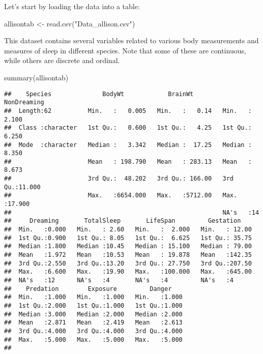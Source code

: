 \documentclass[
]{book}
\newenvironment{Shaded}{\begin{snugshade}}{\end{snugshade}}
\newcommand{\FunctionTok}[1]{\textcolor[rgb]{0.00,0.00,0.00}{#1}}
\newcommand{\NormalTok}[1]{#1}
\newcommand{\OtherTok}[1]{\textcolor[rgb]{0.56,0.35,0.01}{#1}}
\newcommand{\StringTok}[1]{\textcolor[rgb]{0.31,0.60,0.02}{#1}}
\begin{document}
Let's start by loading the data into a table:

\begin{Shaded}
\begin{Highlighting}[]
\NormalTok{allisontab }\OtherTok{\textless{}{-}} \FunctionTok{read.csv}\NormalTok{(}\StringTok{"Data\_allison.csv"}\NormalTok{)}
\end{Highlighting}
\end{Shaded}

This dataset contains several variables related to various body measurements and measures of sleep in different species. Note that some of these are continuous, while others are discrete and ordinal.

\begin{Shaded}
\begin{Highlighting}[]
\FunctionTok{summary}\NormalTok{(allisontab)}
\end{Highlighting}
\end{Shaded}

\begin{verbatim}
##    Species              BodyWt            BrainWt         NonDreaming    
##  Length:62          Min.   :   0.005   Min.   :   0.14   Min.   : 2.100  
##  Class :character   1st Qu.:   0.600   1st Qu.:   4.25   1st Qu.: 6.250  
##  Mode  :character   Median :   3.342   Median :  17.25   Median : 8.350  
##                     Mean   : 198.790   Mean   : 283.13   Mean   : 8.673  
##                     3rd Qu.:  48.202   3rd Qu.: 166.00   3rd Qu.:11.000  
##                     Max.   :6654.000   Max.   :5712.00   Max.   :17.900  
##                                                          NA's   :14      
##     Dreaming       TotalSleep       LifeSpan         Gestation     
##  Min.   :0.000   Min.   : 2.60   Min.   :  2.000   Min.   : 12.00  
##  1st Qu.:0.900   1st Qu.: 8.05   1st Qu.:  6.625   1st Qu.: 35.75  
##  Median :1.800   Median :10.45   Median : 15.100   Median : 79.00  
##  Mean   :1.972   Mean   :10.53   Mean   : 19.878   Mean   :142.35  
##  3rd Qu.:2.550   3rd Qu.:13.20   3rd Qu.: 27.750   3rd Qu.:207.50  
##  Max.   :6.600   Max.   :19.90   Max.   :100.000   Max.   :645.00  
##  NA's   :12      NA's   :4       NA's   :4         NA's   :4       
##    Predation        Exposure         Danger     
##  Min.   :1.000   Min.   :1.000   Min.   :1.000  
##  1st Qu.:2.000   1st Qu.:1.000   1st Qu.:1.000  
##  Median :3.000   Median :2.000   Median :2.000  
##  Mean   :2.871   Mean   :2.419   Mean   :2.613  
##  3rd Qu.:4.000   3rd Qu.:4.000   3rd Qu.:4.000  
##  Max.   :5.000   Max.   :5.000   Max.   :5.000  
## 
\end{verbatim}
\end{document}
